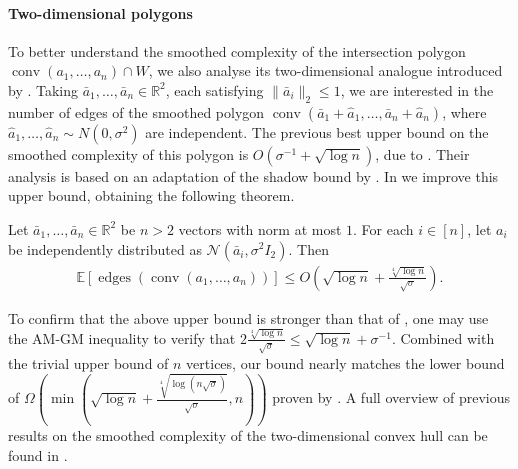 \documentclass{theoretics}
\newcommand{\R}{\mathbb R}
\newcommand{\E}{\mathbb E}
\newcommand{\conv}{\operatorname{conv}}
\newcommand{\edges}{\operatorname{edges}}
\begin{document}
\paragraph{Two-dimensional polygons}
To better understand the smoothed complexity of the intersection polygon $\conv(a_1,\dots,a_n)\cap W$,
we also analyse its two-dimensional analogue introduced by \cite{damerow2004extreme}.
Taking $\bar a_1,\dots,\bar a_n \in \R^2$, each satisfying $\|\bar{a}_i\|_2\leq 1$,
we are interested in the number of edges of the smoothed polygon
$\conv(\bar a_1 + \hat a_1,\dots,\bar a_n + \hat a_n)$,
where $\hat a_1,\dots,\hat a_n \sim N(0,\sigma^2)$ are independent.
The previous best upper bound on the smoothed complexity of this polygon
is $O(\sigma^{-1} + \sqrt{\log n})$, due to \cite{bwcachapter}.
Their analysis is based on an adaptation of the shadow bound by \cite{DH18}.
In  we improve this upper bound, obtaining the following theorem.
\begin{theorem}\label{thm:twod-intro}
    Let $\bar{a}_1, \ldots, \bar{a}_n \in \R^2$ be $n > 2$ vectors with norm at
    most $1$. For each $i \in [n]$, let $a_i$ be independently distributed as
    $\mathcal{N}(\bar{a}_i, \sigma^2 I_{2})$. Then
    \begin{align*}
        \E\left[ \edges\left(\conv(a_1, \ldots, a_n) \right) \right] \leq O\left(\sqrt{\log n} + \frac{\sqrt[4]{\log n}}{\sqrt{\sigma}}\right).
    \end{align*}
\end{theorem}
To confirm that the above upper bound is stronger than that of \cite{bwcachapter}, one may
use the AM-GM inequality to verify that $2\frac{\sqrt[4]{\log n}}{\sqrt{\sigma}} \leq \sqrt{\log n} + \sigma^{-1}$.
Combined with the trivial upper bound of $n$ vertices, our bound nearly matches the lower bound of
$\Omega(\min(\sqrt{\log n} + \frac{\sqrt[4]{\log (n\sqrt\sigma)}}{\sqrt\sigma}, n))$ proven by \cite{DGGT16}.  
A full overview of previous results on the smoothed complexity of the two-dimensional convex hull
can be found in .
\end{document}
